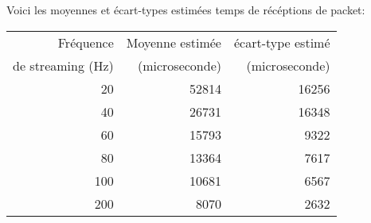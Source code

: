 Voici les moyennes et écart-types estimées temps de récéptions de packet:\\ %

\begin{center}
\begin{tabular}{|r|r|r|}
 \hline
 Fréquence & Moyenne estimée & écart-type estimé\\
 de streaming (Hz) & (microseconde) & (microseconde)\\
 \hline
 20 & 52814 & 16256\\
 40 & 26731 & 16348\\
 60 & 15793 & 9322\\
 80 & 13364 & 7617\\
 100 & 10681 & 6567\\
 200 & 8070 & 2632\\
 \hline
\end{tabular}
\end{center}


